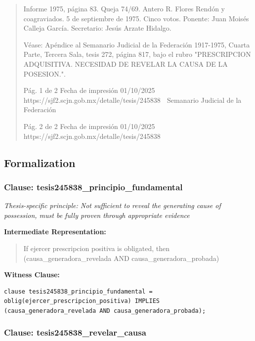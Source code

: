 \documentclass[11pt,a4paper]{article}
\begin{document}
\begin{quote}
Informe 1975, página 83. Queja 74/69. Antero R. Flores Rendón y coagraviados. 5 de septiembre de
1975. Cinco votos. Ponente: Juan Moisés Calleja García. Secretario: Jesús Arzate Hidalgo.

Véase: Apéndice al Semanario Judicial de la Federación 1917-1975, Cuarta Parte, Tercera Sala,
tesis 272, página 817, bajo el rubro "PRESCRIPCION ADQUISITIVA. NECESIDAD DE REVELAR
LA CAUSA DE LA POSESION.".




                                               Pág. 1 de 2              Fecha de impresión 01/10/2025
  https://sjf2.scjn.gob.mx/detalle/tesis/245838
                                                Semanario Judicial de la Federación




                                           Pág. 2 de 2       Fecha de impresión 01/10/2025
https://sjf2.scjn.gob.mx/detalle/tesis/245838

\end{quote}

\subsection{Formalization}

\subsubsection{Clause: tesis245838\_principio\_fundamental}

\textit{Thesis-specific principle: Not sufficient to reveal the generating cause of possession, must be fully proven through appropriate evidence}

\textbf{Intermediate Representation:}

\begin{quote}
If ejercer prescripcion positiva is obligated, then (causa\_generadora\_revelada AND causa\_generadora\_probada)
\end{quote}

\textbf{Witness Clause:}

\begin{lstlisting}[style=witnessstyle, language=Witness]
clause tesis245838_principio_fundamental = oblig(ejercer_prescripcion_positiva) IMPLIES (causa_generadora_revelada AND causa_generadora_probada);
\end{lstlisting}

\subsubsection{Clause: tesis245838\_revelar\_causa}
\end{document}
